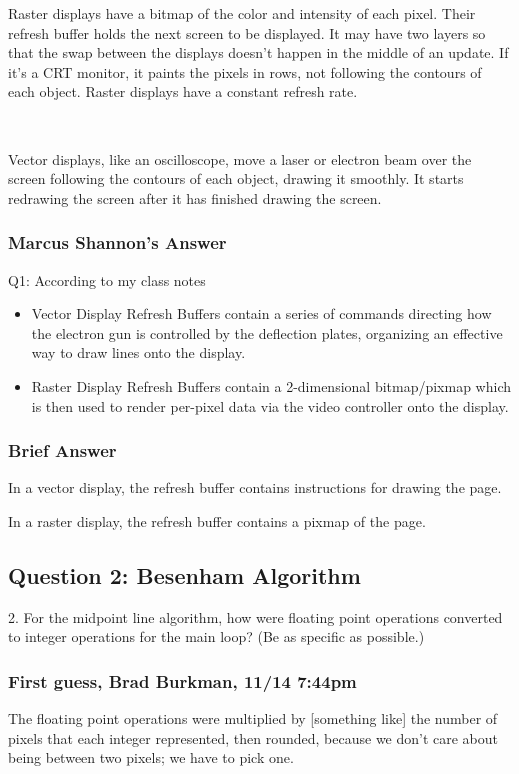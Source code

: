 \documentclass[11pt]{article}
\begin{document}
\begin{spacing}{1.2}
Raster displays have a bitmap of the color and intensity of each pixel.  Their refresh buffer holds the next screen to be displayed.  It may have two layers so that the swap between the displays doesn't happen in the middle of an update.  If it's a CRT monitor, it paints the pixels in rows, not following the contours of each object.  Raster displays have a constant refresh rate.  

\

Vector displays, like an oscilloscope, move a laser or electron beam over the screen following the contours of each object, drawing it smoothly.  It starts redrawing the screen after it has finished drawing the screen.  

\subsubsection{Marcus Shannon's Answer}

Q1: According to my class notes

\begin{itemize}
    \item Vector Display Refresh Buffers contain a series of commands directing how the electron gun is controlled by the deflection plates, organizing an effective way to draw lines onto the display.
    \item Raster Display Refresh Buffers contain a 2-dimensional bitmap/pixmap which is then used to render per-pixel data via the video controller onto the display.
\end{itemize}

\subsubsection{Brief Answer}

In a vector display, the refresh buffer contains instructions for drawing the page.  

In a raster display, the refresh buffer contains a pixmap of the page.  


\subsection{Question 2:  Besenham Algorithm}
2.  For the midpoint line algorithm, how were floating point operations converted to integer operations for the main loop?  (Be as specific as possible.)

\subsubsection{First guess, Brad Burkman, 11/14 7:44pm}
The floating point operations were multiplied by [something like] the number of pixels that each integer represented, then rounded, because we don't care about being between two pixels; we have to pick one.  


\end{spacing}
\end{document}
